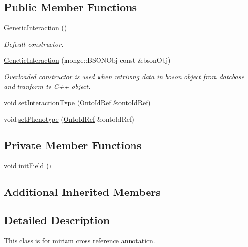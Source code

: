 \subsection*{Public Member Functions}
\begin{DoxyCompactItemize}
\item 
\hyperlink{classunisys_1_1GeneticInteraction_a53ef22c5219fa6eff75d40a464356d8e}{Genetic\-Interaction} ()
\begin{DoxyCompactList}\small\item\em Default constructor. \end{DoxyCompactList}\item 
\hyperlink{classunisys_1_1GeneticInteraction_a8a085b9625e51fce04c13477af04314f}{Genetic\-Interaction} (mongo\-::\-B\-S\-O\-N\-Obj const \&bson\-Obj)
\begin{DoxyCompactList}\small\item\em Overloaded constructor is used when retriving data in boson object from database and tranform to C++ object. \end{DoxyCompactList}\item 
void \hyperlink{classunisys_1_1GeneticInteraction_a086ef8611b4006eb33fd111c2cd109aa}{set\-Interaction\-Type} (\hyperlink{classunisys_1_1OntoIdRef}{Onto\-Id\-Ref} \&onto\-Id\-Ref)
\item 
void \hyperlink{classunisys_1_1GeneticInteraction_ae65dcf635fa1ae1a5590f0c7e718ae30}{set\-Phenotype} (\hyperlink{classunisys_1_1OntoIdRef}{Onto\-Id\-Ref} \&onto\-Id\-Ref)
\end{DoxyCompactItemize}
\subsection*{Private Member Functions}
\begin{DoxyCompactItemize}
\item 
void \hyperlink{classunisys_1_1GeneticInteraction_a946b8270db467290f49a050bd29f55d2}{init\-Field} ()
\end{DoxyCompactItemize}
\subsection*{Additional Inherited Members}


\subsection{Detailed Description}
This class is for miriam cross reference annotation. 

